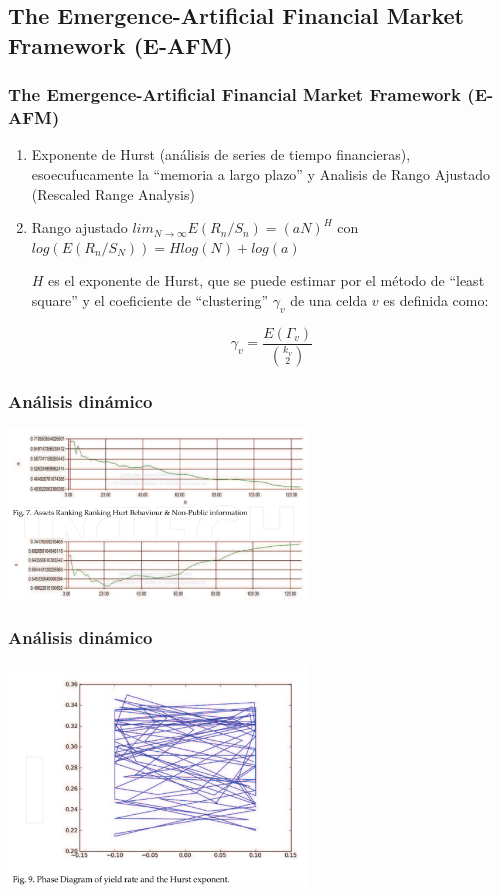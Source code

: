 \documentclass[hyperref={pdfpagelabels=false}]{beamer}
\begin{document}
\subsection{The Emergence-Artificial Financial Market Framework (E-AFM)}
\begin{frame}
\frametitle{The Emergence-Artificial Financial Market Framework (E-AFM)}
\begin{enumerate}
\item Exponente de Hurst  (análisis de series de tiempo financieras), esoecufucamente la ``memoria a largo plazo'' y Analisis de Rango Ajustado (Rescaled Range Analysis)
\item 
Rango ajustado $lim_{N \to \infty}  E(R_n/S_n)=(aN)^H$
con $ log(E(R_n/S_N)) = H log(N) + log(a)$

$H$ es el exponente de Hurst, que se puede estimar por el método de ``least square''
y el coeficiente de ``clustering'' $\gamma_v$ de una celda $v$ es definida como:

$$ \gamma_v = \frac{E(\Gamma_v)}{\binom{k_v}{2}} $$


\end{enumerate}
\end{frame}

\begin{frame}
\frametitle{Análisis dinámico}
\includegraphics[width=300px]{art1.png}
\end{frame}

\begin{frame}
\frametitle{Análisis dinámico}
\includegraphics[width=300px]{art2.png}
\end{frame}
\end{document}
